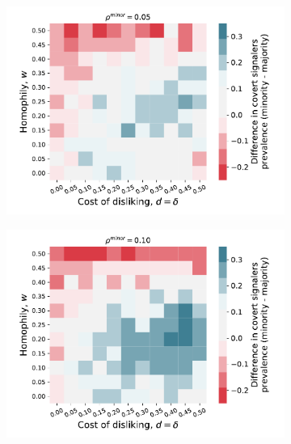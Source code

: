 \documentclass[11pt,letterpaper]{article}
\begin{document}
\begin{figure}[H]
  \centering
  \begin{subfigure}{0.48\textwidth}
    \centering
    \includegraphics[width=\textwidth]{Figures/covert_signalers_diff_0p05.pdf}
  \end{subfigure}
  \hfill
  \begin{subfigure}{0.48\textwidth}
    \centering
    \includegraphics[width=\textwidth]{Figures/covert_signalers_diff_0p10.pdf}
  \end{subfigure} \\[.25in]

\end{figure}
\end{document}
